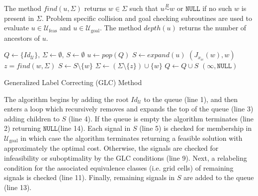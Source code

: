 \documentclass{llncs}
\newcommand{\GLC}{\ensuremath{\mathrm{GLC}}\xspace}
\newcommand{\NULL}{\ensuremath{\mathtt{NULL}}\xspace}
\begin{document}
The method $find(u,\Sigma)$ returns $w\in\Sigma$ such that $u\overset{R}{\sim}w$ or \NULL if no such $w$ is present in $\Sigma$.
%
Problem specific collision and goal checking subroutines are used to evaluate $u\in\mathcal{U}_\mathrm{feas}$ and $u\in\mathcal{U}_\mathrm{goal}$.
%
The method $depth(u)$ returns the number of ancestors of $u$. 
%
\begin{algorithm} 
\begin{algorithmic}[1]
\State $Q\leftarrow \{Id_\mathcal{U}\},\,\Sigma \gets \emptyset,\,S \gets \emptyset$  
\State $u \gets pop(Q)$   
\State $S \gets expand(u)$   
\State \Return $(J_{x_{ic}}(w),w)$ 	
\EndIf       
\State $z = find(w,\Sigma)$ 	  
\State $S \gets S\setminus \{w\}$  	  
\State $\Sigma \gets (\Sigma \setminus \{z\}) \cup \{w\}$ 	  
\EndIf 
\EndFor       
\State $Q \gets Q \cup S$ 
\EndWhile  
\State 
\Return $(\infty,\NULL)$ 
\end{algorithmic} \caption{\label{Alg} Generalized Label Correcting (GLC) Method} 
\end{algorithm}
%

%
The algorithm begins by adding the root $Id_\mathcal{U}$ to the queue (line 1), and then enters a loop which recursively removes and expands the top of the queue (line 3) adding children to $S$ (line 4). 
%
If the queue is empty the algorithm terminates (line 2) returning \NULL (line 14). 
%
Each signal in $S$ (line 5) is checked for membership in $\mathcal{U}_\mathrm{goal}$ in which case the algorithm terminates returning a feasible solution with approximately the optimal cost. 
%
Otherwise, the signals are checked for infeasibility or suboptimality by the \GLC conditions (line 9). 
%
Next, a relabeling condition for the associated equivalence classes (i.e. grid cells) of remaining signals is checked (line 11). 
%
Finally, remaining signals in $S$ are added to the queue (line 13).  
%
\end{document}
